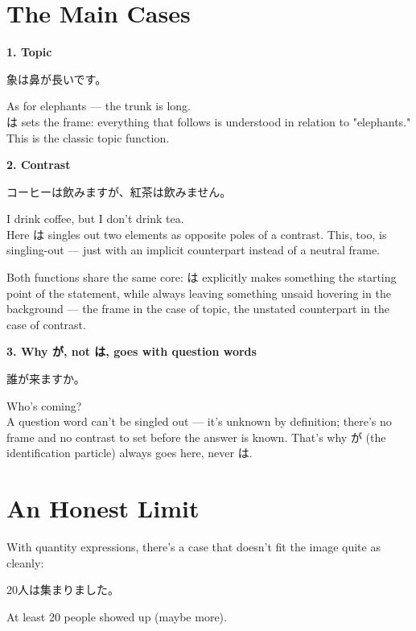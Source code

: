 \documentclass[12pt]{book}
\begin{document}
\section*{The Main Cases}

\textbf{1. Topic}
\par\quad 象は鼻が長いです。\\
\par\quad As for elephants — the trunk is long.\\

は sets the frame: everything that follows is understood in relation to "elephants." This is the classic topic function.

\textbf{2. Contrast}
\par\quad コーヒーは飲みますが、紅茶は飲みません。\\
\par\quad I drink coffee, but I don't drink tea.\\

Here は singles out two elements as opposite poles of a contrast. This, too, is singling-out — just with an implicit counterpart instead of a neutral frame.

Both functions share the same core: は explicitly makes something the starting point of the statement, while always leaving something unsaid hovering in the background — the frame in the case of topic, the unstated counterpart in the case of contrast.

\textbf{3. Why が, not は, goes with question words}
\par\quad 誰が来ますか。\\
\par\quad Who's coming?\\

A question word can't be singled out — it's unknown by definition; there's no frame and no contrast to set before the answer is known. That's why が (the identification particle) always goes here, never は.

\section*{An Honest Limit}

With quantity expressions, there's a case that doesn't fit the image quite as cleanly:

\par\quad 20人は集まりました。\\
\par\quad At least 20 people showed up (maybe more).\\
\end{document}
